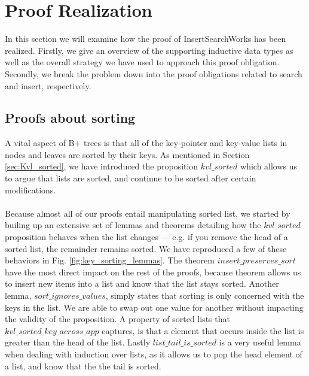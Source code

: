 \section{Proof Realization}
\label{sec:ProofRealization}
In this section we will examine how the proof of InsertSearchWorks has been realized. Firstly, we give an overview of the supporting inductive data types as well as the overall strategy we have used to approach this proof obligation. Secondly, we break the problem down into the proof obligations related to search and insert, respectively. 

\subsection{Proofs about sorting}
A vital aspect of B+ trees is that all of the key-pointer and key-value lists in nodes and leaves are sorted by their keys. As mentioned in Section \ref{sec:Kvl_sorted}, we have introduced the proposition $kvl\_sorted$ which allows us to argue that lists are sorted, and continue to be sorted after certain modifications.

\paragraph{}
Because almost all of our proofs entail manipulating sorted list, we started by builing up an extensive set of lemmas and theorems detailing how the $kvl\_sorted$ proposition behaves when the list changes --- e.g. if you remove the head of a sorted list, the remainder remains sorted. We have reproduced a few of these behaviors in Fig. \ref{fig:key_sorting_lemmas}. The theorem $insert\_preserves\_sort$ have the most direct impact on the rest of the proofs, because theorem allows us to insert new items into a list and know that the list stays sorted. Another lemma, $sort\_ignores\_values$, simply states that sorting is only concerned with the keys in the list. We are able to swap out one value for another without impacting the validity of the proposition. A property of sorted lists that $kvl\_sorted\_key\_across\_app$ captures, is that a element that occurs inside the list is greater than the head of the list. Lastly $list\_tail\_is\_sorted$ is a very useful lemma when dealing with induction over lists, as it allows us to pop the head element of a list, and know that the the tail is sorted.

